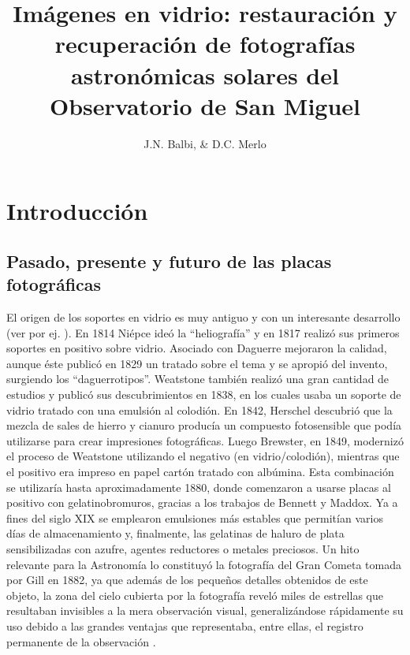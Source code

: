 \documentclass[baaa]{baaa}
\title{Imágenes en vidrio: restauración y recuperación de fotografías astronómicas solares del Observatorio de San Miguel}
\author{
J.N. Balbi\inst{1},
\&
D.C. Merlo\inst{2}
}
\institute{
Museo ``Lic. Gustavo Rodríguez'', Observatorio de Física Cósmica ``Padre Bussolini'', Argentina
\and
Museo del Observatorio Astronómico de Córdoba, UNC, Argentina
}
\begin{document}
\maketitle
\section{Introducci\'on}\label{intro}
\subsection{Pasado, presente y futuro de las placas fotográficas}\label{intro_a}
El origen de los soportes en vidrio es muy antiguo y con un interesante desarrollo (ver por ej. \citealp{Rose2007}). En 1814 Niépce ideó la ``heliografía'' y en 1817 realizó sus primeros
soportes en positivo sobre vidrio. Asociado con Daguerre mejoraron la calidad, aunque éste publicó en 1829 un tratado sobre el tema y se apropió del invento, surgiendo los ``daguerrotipos''.
Weatstone también realizó una gran cantidad de estudios y publicó sus descubrimientos en 1838, en los cuales usaba un soporte de vidrio tratado con una emulsión al colodión.
En 1842, Herschel descubrió que la mezcla de sales de hierro y cianuro producía un compuesto fotosensible que podía utilizarse para crear impresiones fotográficas. 
Luego Brewster, en 1849, modernizó el proceso de Weatstone utilizando el negativo (en vidrio/colodión), mientras que el positivo era impreso en papel cartón tratado con albúmina.
Esta combinación se utilizaría hasta aproximadamente 1880, donde comenzaron a usarse placas al positivo con gelatinobromuros, gracias a los trabajos de Bennett y Maddox.
Ya a fines del siglo XIX se emplearon emulsiones más estables que permitían varios días de almacenamiento y, finalmente, las gelatinas de haluro de plata sensibilizadas con azufre, agentes reductores o metales preciosos.
Un hito relevante para la Astronomía lo constituyó la fotografía del Gran Cometa tomada por Gill en 1882, ya que además de los pequeños detalles obtenidos de este objeto, la zona del cielo cubierta por la fotografía reveló miles de estrellas que resultaban invisibles a la mera observación visual, generalizándose rápidamente su uso debido a las grandes ventajas que representaba, entre ellas, el registro permanente de la observación \citep{Bachiller2009}.
\end{document}
